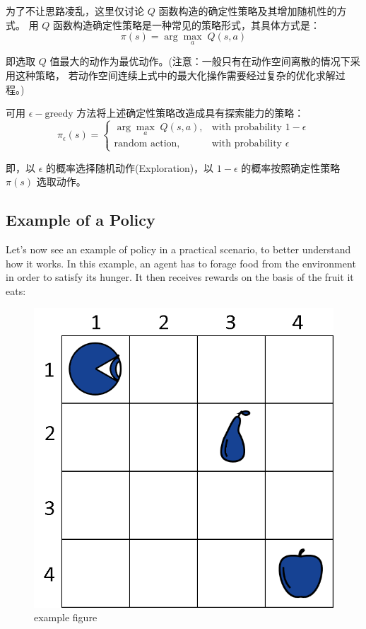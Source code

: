 为了不让思路凌乱，这里仅讨论 $Q$ 函数构造的确定性策略及其增加随机性的方式。
用 $Q$ 函数构造确定性策略是一种常见的策略形式，其具体方式是：
$$
\pi(s)= \arg \underset{a}{\max}\; Q(s, a)
$$

即选取 $Q$ 值最大的动作为最优动作。(注意：一般只有在动作空间离散的情况下采用这种策略，
若动作空间连续上式中的最大化操作需要经过复杂的优化求解过程。)

可用 $\epsilon-\text{greedy}$ 方法将上述确定性策略改造成具有探索能力的策略：
$$
\pi_\epsilon(s)=\begin{cases}
\arg\max_a\; Q(s,a), &\text{with probability } 1 - \epsilon \\
\text{random action}, &\text{with probability } \epsilon
\end{cases}
$$

即，以 $\epsilon$ 的概率选择随机动作(Exploration)，以 $1 - \epsilon$ 
的概率按照确定性策略 $\pi(s)$ 选取动作。


\subsection{Example of a Policy}

Let's now see an example of policy in a practical scenario, 
to better understand how it works. In this example, an agent 
has to forage food from the environment in order to satisfy 
its hunger. It then receives rewards on the basis of the 
fruit it eats:

\begin{figure}[ht]

\centering
\includegraphics[scale=0.5]{pix/example1.png}
\caption{example figure}
\end{figure}


